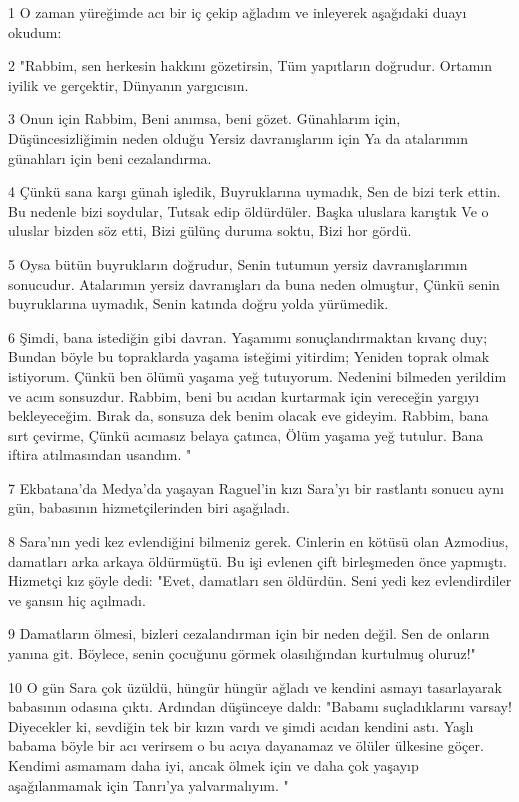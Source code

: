 \par 1 O zaman yüreğimde acı bir iç çekip ağladım ve inleyerek aşağıdaki duayı okudum:
\par 2 "Rabbim, sen herkesin hakkını gözetirsin, Tüm yapıtların doğrudur. Ortamın iyilik ve gerçektir, Dünyanın yargıcısın.
\par 3 Onun için Rabbim, Beni anımsa, beni gözet. Günahlarım için, Düşüncesizliğimin neden olduğu Yersiz davranışlarım için Ya da atalarımın günahları için beni cezalandırma.
\par 4 Çünkü sana karşı günah işledik, Buyruklarına uymadık, Sen de bizi terk ettin. Bu nedenle bizi soydular, Tutsak edip öldürdüler. Başka uluslara karıştık Ve o uluslar bizden söz etti, Bizi gülünç duruma soktu, Bizi hor gördü.
\par 5 Oysa bütün buyrukların doğrudur, Senin tutumun yersiz davranışlarımın sonucudur. Atalarımın yersiz davranışları da buna neden olmuştur, Çünkü senin buyruklarına uymadık, Senin katında doğru yolda yürümedik.
\par 6 Şimdi, bana istediğin gibi davran. Yaşamımı sonuçlandırmaktan kıvanç duy; Bundan böyle bu topraklarda yaşama isteğimi yitirdim; Yeniden toprak olmak istiyorum. Çünkü ben ölümü yaşama yeğ tutuyorum. Nedenini bilmeden yerildim ve acım sonsuzdur. Rabbim, beni bu acıdan kurtarmak için vereceğin yargıyı bekleyeceğim. Bırak da, sonsuza dek benim olacak eve gideyim. Rabbim, bana sırt çevirme, Çünkü acımasız belaya çatınca, Ölüm yaşama yeğ tutulur. Bana iftira atılmasından usandım. "
\par 7 Ekbatana'da Medya'da yaşayan Raguel'in kızı Sara'yı bir rastlantı sonucu aynı gün, babasının hizmetçilerinden biri aşağıladı.
\par 8 Sara'nın yedi kez evlendiğini bilmeniz gerek. Cinlerin en kötüsü olan Azmodius, damatları arka arkaya öldürmüştü. Bu işi evlenen çift birleşmeden önce yapmıştı. Hizmetçi kız şöyle dedi: "Evet, damatları sen öldürdün. Seni yedi kez evlendirdiler ve şansın hiç açılmadı.
\par 9 Damatların ölmesi, bizleri cezalandırman için bir neden değil. Sen de onların yanına git. Böylece, senin çocuğunu görmek olasılığından kurtulmuş oluruz!"
\par 10 O gün Sara çok üzüldü, hüngür hüngür ağladı ve kendini asmayı tasarlayarak babasının odasına çıktı. Ardından düşünceye daldı: "Babamı suçladıklarını varsay! Diyecekler ki, sevdiğin tek bir kızın vardı ve şimdi acıdan kendini astı. Yaşlı babama böyle bir acı verirsem o bu acıya dayanamaz ve ölüler ülkesine göçer. Kendimi asmamam daha iyi, ancak ölmek için ve daha çok yaşayıp aşağılanmamak için Tanrı'ya yalvarmalıyım. "

